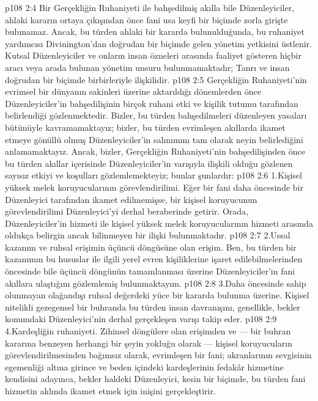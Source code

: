 \vs p108 2:4 Bir Gerçekliğin Ruhaniyeti ile bahşedilmiş akılla bile Düzenleyiciler, ahlaki kararın ortaya çıkışından önce fani usa keyfi bir biçimde zorla girişte bulunamaz. Ancak, bu türden ahlaki bir kararda bulunulduğunda, bu ruhaniyet yardımcısı Divinington’dan doğrudan bir biçimde gelen yönetim yetkisini üstlenir. Kutsal Düzenleyiciler ve onların insan özneleri arasında faaliyet gösteren hiçbir aracı veya arada bulunan yönetim unsuru bulunmamaktadır; Tanrı ve insan doğrudan bir biçimde birbirleriyle ilişkilidir.
\vs p108 2:5 Gerçekliğin Ruhaniyeti’nin evrimsel bir dünyanın sakinleri üzerine aktarıldığı dönemlerden önce Düzenleyiciler’in bahşedilişinin birçok ruhani etki ve kişilik tutumu tarafından belirlendiği gözlenmektedir. Bizler, bu türden bahşedilmeleri düzenleyen yasaları bütünüyle kavramamaktayız; bizler, bu türden evrimleşen akıllarda ikamet etmeye gönüllü olmuş Düzenleyiciler’in salınımını tam olarak neyin belirlediğini anlamamaktayız. Ancak, bizler, Gerçekliğin Ruhaniyeti’nin bahşedilişinden önce bu türden akıllar içerisinde Düzenleyiciler’in varışıyla ilişkili olduğu gözlenen sayısız etkiyi ve koşulları gözlemlemekteyiz; bunlar şunlardır:
\vs p108 2:6 1.\bibnobreakspace Kişisel yüksek melek koruyucularının görevlendirilimi. Eğer bir fani daha öncesinde bir Düzenleyici tarafından ikamet edilmemişse, bir kişisel koruyucunun görevlendirilimi Düzenleyici’yi derhal beraberinde getirir. Orada, Düzenleyiciler’in hizmeti ile kişisel yüksek melek koruyucularının hizmeti arasında oldukça belirgin ancak bilinmeyen bir ilişki bulunmaktadır.
\vs p108 2:7 2.\bibnobreakspace Ussal kazanım ve ruhsal erişimin üçüncü döngüsüne olan erişim. Ben, bu türden bir kazanımın bu hususlar ile ilgili yerel evren kişiliklerine işaret edilebilmelerinden öncesinde bile üçüncü döngünün tamamlanması üzerine Düzenleyiciler’in fani akıllara ulaştığını gözlemlemiş bulunmaktayım.
\vs p108 2:8 3.\bibnobreakspace Daha öncesinde sahip olunmayan olağandışı ruhsal değerdeki yüce bir kararda bulunma üzerine. Kişisel nitelikli gezegensel bir buhranda bu türden insan davranışını, genellikle, bekler konumdaki Düzenleyici’nin derhal gerçekleşen varışı takip eder.
\vs p108 2:9 4.\bibnobreakspace Kardeşliğin ruhaniyeti. Zihinsel döngülere olan erişimden ve --- bir buhran kararına benzeyen herhangi bir şeyin yokluğu olarak --- kişisel koruyucuların görevlendirilmesinden bağımsız olarak, evrimleşen bir fani; akranlarının sevgisinin egemenliği altına girince ve beden içindeki kardeşlerinin fedakâr hizmetine kendisini adayınca, bekler haldeki Düzenleyici, kesin bir biçimde, bu türden fani hizmetin aklında ikamet etmek için inişini gerçekleştirir.
